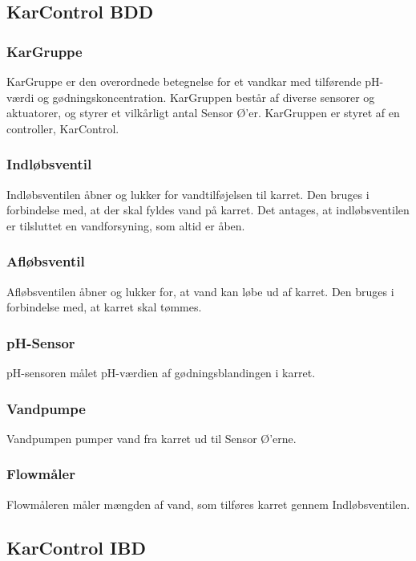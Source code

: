 
\subsection{KarControl BDD}

\subsubsection{KarGruppe}
KarGruppe er den overordnede betegnelse for et vandkar med tilførende pH-værdi og gødningskoncentration. KarGruppen består af diverse sensorer og aktuatorer, og styrer et vilkårligt antal Sensor Ø’er. KarGruppen er styret af en controller, KarControl.

\subsubsection{Indløbsventil}
Indløbsventilen åbner og lukker for vandtilføjelsen til karret. Den bruges i forbindelse med, at der skal fyldes vand på karret. Det antages, at indløbsventilen er tilsluttet en vandforsyning, som altid er åben.

\subsubsection{Afløbsventil}
Afløbsventilen åbner og lukker for, at vand kan løbe ud af karret. Den bruges i forbindelse med, at karret skal tømmes.

\subsubsection{pH-Sensor}
pH-sensoren målet pH-værdien af gødningsblandingen i karret.

\subsubsection{Vandpumpe}
Vandpumpen pumper vand fra karret ud til Sensor Ø’erne.

\subsubsection{Flowmåler}
Flowmåleren måler mængden af vand, som tilføres karret gennem Indløbsventilen.

\subsection{KarControl IBD}

